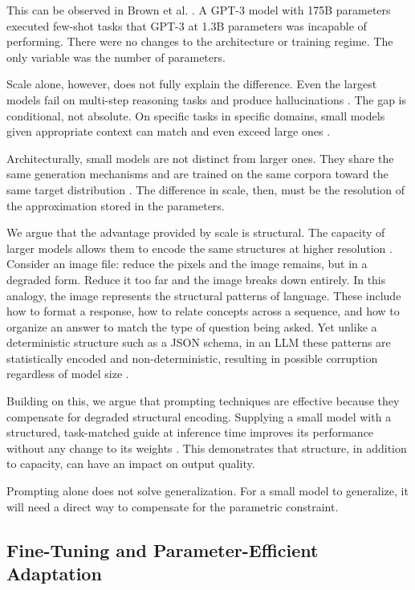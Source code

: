 \documentclass{article}
\begin{document}
This can be observed in Brown et al. \cite{brown2020gpt3}. A GPT-3 model with 175B parameters executed few-shot tasks that GPT-3 at 1.3B parameters was incapable of performing. There were no changes to the architecture or training regime. The only variable was the number of parameters.

Scale alone, however, does not fully explain the difference. Even the largest models fail on multi-step reasoning tasks and produce hallucinations \cite{math_reasoning_limits2024, lrm_complexity2025}. The gap is conditional, not absolute. On specific tasks in specific domains, small models given appropriate context can match and even exceed large ones \cite{smalllmsready2024, modelsizematters2024}.

Architecturally, small models are not distinct from larger ones. They share the same generation mechanisms and are trained on the same corpora toward the same target distribution \cite{godey2024softmax, costofdownscaling2023}. The difference in scale, then, must be the resolution of the approximation stored in the parameters.

We argue that the advantage provided by scale is structural. The capacity of larger models allows them to encode the same structures at higher resolution \cite{godey2024softmax}. Consider an image file: reduce the pixels and the image remains, but in a degraded form. Reduce it too far and the image breaks down entirely. In this analogy, the image represents the structural patterns of language. These include how to format a response, how to relate concepts across a sequence, and how to organize an answer to match the type of question being asked. Yet unlike a deterministic structure such as a JSON schema, in an LLM these patterns are statistically encoded and non-deterministic, resulting in possible corruption regardless of model size \cite{math_reasoning_limits2024, lrm_complexity2025}.

Building on this, we argue that prompting techniques are effective because they compensate for degraded structural encoding. Supplying a small model with a structured, task-matched guide at inference time improves its performance without any change to its weights \cite{han2025blueprints}. This demonstrates that structure, in addition to capacity, can have an impact on output quality.

Prompting alone does not solve generalization. For a small model to generalize, it will need a direct way to compensate for the parametric constraint.

\subsection{Fine-Tuning and Parameter-Efficient Adaptation}
\end{document}
